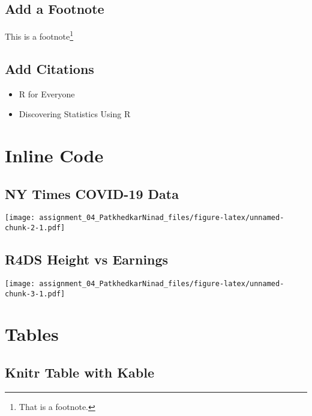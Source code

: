 \documentclass[
]{article}
\providecommand{\tightlist}{%
  \setlength{\itemsep}{0pt}\setlength{\parskip}{0pt}}
\begin{document}
\hypertarget{add-a-footnote}{%
\subsection{Add a Footnote}\label{add-a-footnote}}

This is a footnote\footnote{That is a footnote.}

\hypertarget{add-citations}{%
\subsection{Add Citations}\label{add-citations}}

\begin{itemize}
\tightlist
\item
  R for Everyone
\item
  Discovering Statistics Using R
\end{itemize}

\hypertarget{inline-code}{%
\section{Inline Code}\label{inline-code}}

\hypertarget{ny-times-covid-19-data}{%
\subsection{NY Times COVID-19 Data}\label{ny-times-covid-19-data}}

\texttt{[image: assignment\_04\_PatkhedkarNinad\_files/figure-latex/unnamed-chunk-2-1.pdf]}

\hypertarget{r4ds-height-vs-earnings}{%
\subsection{R4DS Height vs Earnings}\label{r4ds-height-vs-earnings}}

\texttt{[image: assignment\_04\_PatkhedkarNinad\_files/figure-latex/unnamed-chunk-3-1.pdf]}

\hypertarget{tables}{%
\section{Tables}\label{tables}}

\hypertarget{knitr-table-with-kable}{%
\subsection{Knitr Table with Kable}\label{knitr-table-with-kable}}
\end{document}
